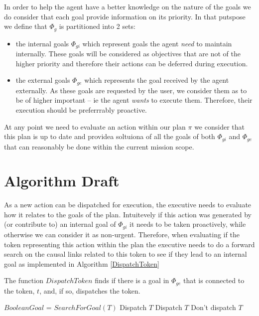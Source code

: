 In order to help the agent have a better knowledge on the nature of
the goals we do consider that each goal provide information on its
priority. In that putspose we define that $\Phi_g$ is partitioned into
2 sets:
\begin{itemize}
\item the internal goals $\Phi_{gi}$ which represent goals the agent
  {\em need} to maintain internally. These goals will be considered 
  as objectives that are not of the higher priority and therefore
  their actions can be deferred during execution.
\item the external goals $\Phi_{ge}$ which represents the goal
  received by the agent externally. As these goals are requested by
  the user, we consider them as to be of higher important -- ie the
  agent {\em wants} to execute them. Therefore, their execution should
  be preferrrably proactive.
\end{itemize}

At any point we need to evaluate an action within our plan $\pi$ we
consider that this plan is up to date and providea soltuiona of all 
the goals of both $\Phi_{gi}$ and $\Phi_{ge}$ that can reasonably  be
done within the current mission scope.


\section{Algorithm Draft}

As a new action can be dispatched for execution, the executive
needs to evaluate how it relates to the goals of the plan. Intuitevely
if this action was generated by (or contribute to) an internal goal of
$\Phi_{gi}$ it needs to be taken proactively, while otherwise we can 
consider it as non-urgent. Therefore, when evaluating if the token
representing this action  within the plan the executive needs to do a
forward search on the causal links related to this token to see if
they lead to an internal goal as implemented in Algorithm \ref{DispatchToken}


\begin{algorithm}
\caption{The function $DispatchToken$ finds if there is a goal in $\Phi_{ge}$ that is connected
to the token, $t$, and, if so, dispatches the token.}
\label{DispatchToken}
\begin{algorithmic}
\State $Boolean Goal$ = $SearchForGoal( T )$
	\State \Return Dispatch $T$
	\State \Return Dispatch $T$
\Else
	\State \Return Don't dispatch $T$
\EndIf
\EndFunction
\end{algorithmic}
\end{algorithm}

